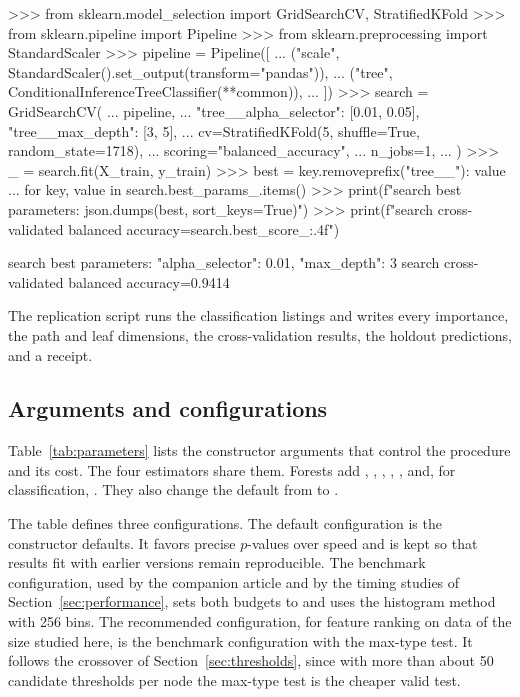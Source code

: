 \documentclass[article]{jss}
\begin{document}
\begin{CodeChunk}
\begin{CodeInput}
>>> from sklearn.model_selection import GridSearchCV, StratifiedKFold
>>> from sklearn.pipeline import Pipeline
>>> from sklearn.preprocessing import StandardScaler
>>> pipeline = Pipeline([
...     ("scale", StandardScaler().set_output(transform="pandas")),
...     ("tree", ConditionalInferenceTreeClassifier(**common)),
... ])
>>> search = GridSearchCV(
...     pipeline,
...     {"tree__alpha_selector": [0.01, 0.05], "tree__max_depth": [3, 5]},
...     cv=StratifiedKFold(5, shuffle=True, random_state=1718),
...     scoring="balanced_accuracy",
...     n_jobs=1,
... )
>>> _ = search.fit(X_train, y_train)
>>> best = {key.removeprefix("tree__"): value
...         for key, value in search.best_params_.items()}
>>> print(f"search best parameters: {json.dumps(best, sort_keys=True)}")
>>> print(f"search cross-validated balanced accuracy={search.best_score_:.4f}")
\end{CodeInput}
\begin{CodeOutput}
search best parameters: {"alpha_selector": 0.01, "max_depth": 3}
search cross-validated balanced accuracy=0.9414
\end{CodeOutput}
\end{CodeChunk}
%
The replication script  runs the classification listings
and writes every importance, the path and leaf dimensions, the
cross-validation results, the holdout predictions, and a receipt.

\subsection{Arguments and configurations} \label{sec:parameters}

Table~\ref{tab:parameters} lists the constructor arguments that control the
procedure and its cost. The four estimators share them. Forests add
, , , ,
, and, for classification, . They also
change the  default from  to .

The table defines three configurations. The default configuration is the
constructor defaults. It favors precise $p$-values over speed and is kept so
that results fit with earlier versions remain reproducible. The benchmark
configuration, used by the companion article and by the timing studies of
Section~\ref{sec:performance}, sets both budgets to  and uses
the histogram method with 256 bins. The recommended configuration, for feature
ranking on data of the size studied here, is the benchmark configuration with
the max-type test. It follows the crossover of Section~\ref{sec:thresholds},
since with more than about 50 candidate thresholds per node the max-type test
is the cheaper valid test.
\end{document}

